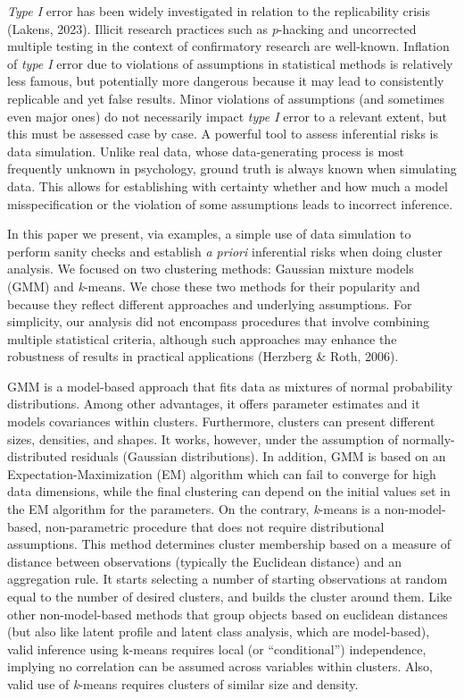 \documentclass[
  man,floatsintext]{apa7}
\begin{document}
\emph{Type I} error has been widely investigated in relation to the replicability crisis (Lakens, 2023). Illicit research practices such as \emph{p}-hacking and uncorrected multiple testing in the context of confirmatory research are well-known. Inflation of \emph{type I} error due to violations of assumptions in statistical methods is relatively less famous, but potentially more dangerous because it may lead to consistently replicable and yet false results. Minor violations of assumptions (and sometimes even major ones) do not necessarily impact \emph{type I} error to a relevant extent, but this must be assessed case by case. A powerful tool to assess inferential risks is data simulation. Unlike real data, whose data-generating process is most frequently unknown in psychology, ground truth is always known when simulating data. This allows for establishing with certainty whether and how much a model misspecification or the violation of some assumptions leads to incorrect inference.

In this paper we present, via examples, a simple use of data simulation to perform sanity checks and establish \emph{a priori} inferential risks when doing cluster analysis. We focused on two clustering methods: Gaussian mixture models (GMM) and \emph{k}-means. We chose these two methods for their popularity and because they reflect different approaches and underlying assumptions. \color{red} For simplicity, our analysis did not encompass procedures that involve combining multiple statistical criteria, although such approaches may enhance the robustness of results in practical applications (Herzberg \& Roth, 2006).\color{black}

GMM is a model-based approach that fits data as mixtures of normal probability distributions. Among other advantages, it offers parameter estimates and it models covariances within clusters. Furthermore, clusters can present different sizes, densities, and shapes. It works, however, under the assumption of normally-distributed residuals (Gaussian distributions). In addition, GMM is based on an Expectation-Maximization (EM) algorithm which can fail to converge for high data dimensions, while the final clustering can depend on the initial values set in the EM algorithm for the parameters. On the contrary, \emph{k}-means is a non-model-based, non-parametric procedure that does not require distributional assumptions. This method determines cluster membership based on a measure of distance between observations (typically the Euclidean distance) and an aggregation rule. It starts selecting a number of starting observations at random equal to the number of desired clusters, and builds the cluster around them. Like other non-model-based methods that group objects based on euclidean distances (but also like latent profile and latent class analysis, which are model-based), valid inference using k-means requires local (or ``conditional'') independence, implying no correlation can be assumed across variables within clusters. Also, valid use of \emph{k}-means requires clusters of similar size and density.
\end{document}
